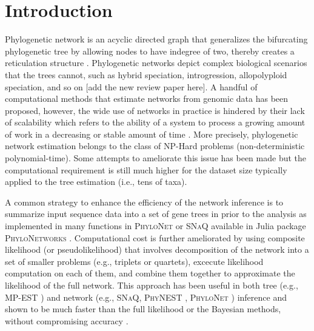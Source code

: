 \documentclass[unnumsec,webpdf,contemporary,large]{oup-authoring-template}%
\theoremstyle{thmstyleone}%
\theoremstyle{thmstyletwo}%
\theoremstyle{thmstylethree}%
\begin{document}
\maketitle

\section{Introduction}\label{sec1}
Phylogenetic network is an acyclic directed graph that generalizes the bifurcating phylogenetic tree by allowing nodes to have indegree of two, thereby creates a reticulation structure \citep{huson2010,kong2022a}. Phylogenetic networks depict complex biological scenarios that the trees cannot, such as hybrid speciation, introgression, allopolyploid speciation, and so on \citep{huson2006}[add the new review paper here]. A handful of computational methods that estimate networks from genomic data has been proposed, however, the wide use of networks in practice is hindered by their lack of scalability which refers to the ability of a system to process a growing amount of work in a decreasing or stable amount of time \citep{bondi2000}. More precisely, phylogenetic network estimation belongs to the class of NP-Hard problems (non-deterministic polynomial-time). Some attempts to ameliorate this issue has been made but the computational requirement is still much higher for the dataset size typically applied to the tree estimation (i.e., tens of taxa).

A common strategy to enhance the efficiency of the network inference is to summarize input sequence data into a set of gene trees in prior to the analysis as implemented in many functions in \textsc{PhyloNet} \citep{than2008,wen2018a} or \textsc{SNaQ} \citep{solis-lemus2016} available in Julia package \textsc{PhyloNetworks} \citep{solis-lemus2017}. Computational cost is further ameliorated by using composite likelihood (or pseudolikelihood) that involves decomposition of the network into a set of smaller problems (e.g., triplets or quartets), excecute likelihood computation on each of them, and combine them together to approximate the likelihood of the full network. This approach has been useful in both tree (e.g., \textsc{MP-EST} \citep{liu2010}) and network (e.g., \textsc{SNaQ}, \textsc{PhyNEST} \citep{kong2022c}, \textsc{PhyloNet} \citep{yu2015,zhu2018a}) inference and shown to be much faster than the full likelihood or the Bayesian methods, without compromising accuracy \citep{hejase2016}.
\end{document}
